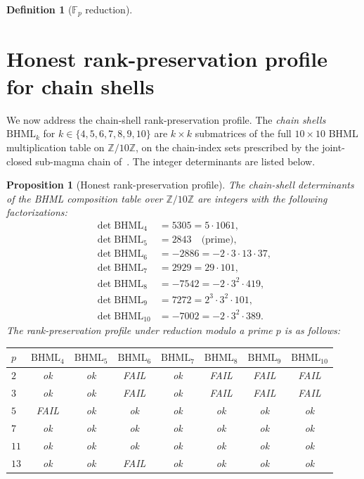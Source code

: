 \documentclass[11pt,reqno]{amsart}
\theoremstyle{plain}
\newtheorem{proposition}[theorem]{Proposition}
\theoremstyle{definition}
\newtheorem{definition}[theorem]{Definition}
\theoremstyle{remark}
\newcommand{\Z}{\mathbb{Z}}
\newcommand{\F}{\mathbb{F}}
\newcommand{\BHML}{\mathrm{BHML}}
\begin{document}
\begin{definition}[$\F_{p}$ reduction]
\section{Honest rank-preservation profile for chain shells}
\label{sec:chain}

We now address the chain-shell rank-preservation profile. The
\emph{chain shells} $\BHML_{k}$ for $k \in \{4, 5, 6, 7, 8, 9, 10\}$
are $k \times k$ submatrices of the full $10 \times 10$ BHML
multiplication table on $\Z/10\Z$, on the chain-index sets
prescribed by the joint-closed sub-magma chain
of~\cite{SandersGishFourCore}. The integer determinants are listed
below.

\begin{proposition}[Honest rank-preservation profile]
\label{prop:rank-honest}
The chain-shell determinants of the BHML composition table over
$\Z/10\Z$ are integers with the following factorizations:
\begin{align*}
\det \BHML_{4} &= 5305 = 5 \cdot 1061, \\
\det \BHML_{5} &= 2843 \quad \text{(prime)}, \\
\det \BHML_{6} &= -2886 = -2 \cdot 3 \cdot 13 \cdot 37, \\
\det \BHML_{7} &= 2929 = 29 \cdot 101, \\
\det \BHML_{8} &= -7542 = -2 \cdot 3^{2} \cdot 419, \\
\det \BHML_{9} &= 7272 = 2^{3} \cdot 3^{2} \cdot 101, \\
\det \BHML_{10} &= -7002 = -2 \cdot 3^{2} \cdot 389.
\end{align*}
The rank-preservation profile under reduction modulo a prime $p$ is
as follows:

\begin{center}
\begin{tabular}{l c c c c c c c}
\toprule
$p$ & $\BHML_{4}$ & $\BHML_{5}$ & $\BHML_{6}$ & $\BHML_{7}$
    & $\BHML_{8}$ & $\BHML_{9}$ & $\BHML_{10}$ \\
\midrule
$2$  & ok       & ok       & FAIL     & ok       & FAIL     & FAIL     & FAIL     \\
$3$  & ok       & ok       & FAIL     & ok       & FAIL     & FAIL     & FAIL     \\
$5$  & FAIL     & ok       & ok       & ok       & ok       & ok       & ok       \\
$7$  & ok       & ok       & ok       & ok       & ok       & ok       & ok       \\
$11$ & ok       & ok       & ok       & ok       & ok       & ok       & ok       \\
$13$ & ok       & ok       & FAIL     & ok       & ok       & ok       & ok       \\
\bottomrule
\end{tabular}
\end{center}


\end{proposition}
\end{definition}
\end{document}
